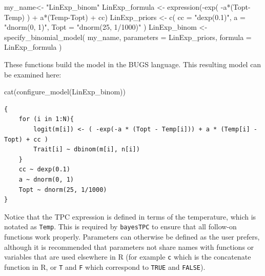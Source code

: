 \documentclass[
  12pt,
]{article}
\newenvironment{Shaded}{\begin{snugshade}}{\end{snugshade}}
\newcommand{\AttributeTok}[1]{\textcolor[rgb]{0.40,0.45,0.13}{#1}}
\newcommand{\FunctionTok}[1]{\textcolor[rgb]{0.28,0.35,0.67}{#1}}
\newcommand{\NormalTok}[1]{\textcolor[rgb]{0.00,0.23,0.31}{#1}}
\newcommand{\OtherTok}[1]{\textcolor[rgb]{0.00,0.23,0.31}{#1}}
\newcommand{\SpecialCharTok}[1]{\textcolor[rgb]{0.37,0.37,0.37}{#1}}
\newcommand{\StringTok}[1]{\textcolor[rgb]{0.13,0.47,0.30}{#1}}
\begin{document}
\begin{Shaded}
\begin{Highlighting}[]
\NormalTok{my\_name}\OtherTok{\textless{}{-}} \StringTok{"LinExp\_binom"}
\NormalTok{LinExp\_formula }\OtherTok{\textless{}{-}} \FunctionTok{expression}\NormalTok{(}\SpecialCharTok{{-}}\FunctionTok{exp}\NormalTok{( }\SpecialCharTok{{-}}\NormalTok{a}\SpecialCharTok{*}\NormalTok{(Topt}\SpecialCharTok{{-}}\NormalTok{Temp) ) }\SpecialCharTok{+}\NormalTok{ a}\SpecialCharTok{*}\NormalTok{(Temp}\SpecialCharTok{{-}}\NormalTok{Topt) }\SpecialCharTok{+}\NormalTok{ cc)}
\NormalTok{LinExp\_priors }\OtherTok{\textless{}{-}} \FunctionTok{c}\NormalTok{( }\AttributeTok{cc =} \StringTok{"dexp(0.1)"}\NormalTok{,}
                    \AttributeTok{a =} \StringTok{"dnorm(0, 1)"}\NormalTok{,}
                    \AttributeTok{Topt  =} \StringTok{"dnorm(25, 1/1000)"}
\NormalTok{                    )}
\NormalTok{LinExp\_binom }\OtherTok{\textless{}{-}} \FunctionTok{specify\_binomial\_model}\NormalTok{( my\_name,}
                                        \AttributeTok{parameters =}\NormalTok{ LinExp\_priors,}
                                        \AttributeTok{formula =}\NormalTok{ LinExp\_formula}
\NormalTok{                                        )}
\end{Highlighting}
\end{Shaded}

These functions build the model in the BUGS language. This resulting
model can be examined here:

\begin{Shaded}
\begin{Highlighting}[]
\FunctionTok{cat}\NormalTok{(}\FunctionTok{configure\_model}\NormalTok{(LinExp\_binom))}
\end{Highlighting}
\end{Shaded}

\begin{verbatim}
{
    for (i in 1:N){
        logit(m[i]) <- ( -exp(-a * (Topt - Temp[i])) + a * (Temp[i] - Topt) + cc )
        Trait[i] ~ dbinom(m[i], n[i])
    }
    cc ~ dexp(0.1)
    a ~ dnorm(0, 1)
    Topt ~ dnorm(25, 1/1000)
}
\end{verbatim}

Notice that the TPC expression is defined in terms of the temperature,
which is notated as \texttt{Temp}. This is required by \texttt{bayesTPC}
to ensure that all follow-on functions work properly. Parameters can
otherwise be defined as the user prefers, although it is recommended
that parameters not share names with functions or variables that are
used elsewhere in R (for example \texttt{c} which is the concatenate
function in R, or \texttt{T} and \texttt{F} which correspond to
\texttt{TRUE} and \texttt{FALSE}).
\end{document}
